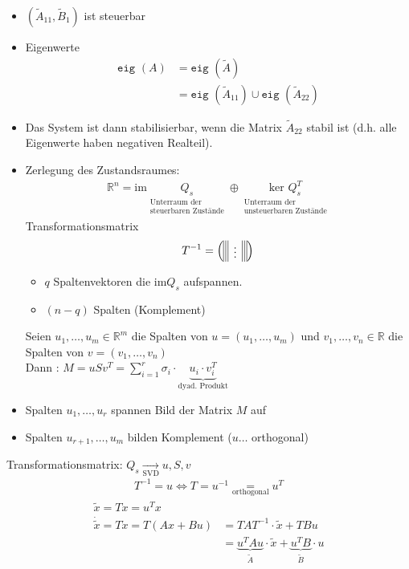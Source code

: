 \documentclass[ngerman]{tudscrreprt}
\begin{document}
\begin{itemize}
\item $(\tilde A_{11}, \tilde B_{1})$ ist steuerbar
\item Eigenwerte \begin{align*}\texttt{eig }(A) &= \texttt{eig }(\tilde A)\\ &= \texttt{eig }(\tilde A_{11}) \cup \texttt{eig }(\tilde A_{22})\end{align*}
\item Das System ist dann stabilisierbar, wenn die Matrix $\tilde A_{22} $ stabil ist (d.h. alle Eigenwerte haben negativen Realteil). 
\item Zerlegung des Zustandsraumes: \begin{align*}
\mathbb{R}^n = \text{im} \underset{\substack{\text{Unterraum der}\\ \text{steuerbaren Zustände}}}{Q_s} \oplus \underset{\substack{\text{Unterraum der}\\ \text{unsteuerbaren Zustände}}}{\text{ker }Q_s^T}
\end{align*}
Transformationsmatrix 
\begin{align*}
T^{-1} = \left(\begin{array}{ ||| c |||}
\vdots
\end{array}\right)
\end{align*}
\begin{itemize}
\item $q$ Spaltenvektoren die im$ Q_s$ aufspannen.
\item $(n-q)$ Spalten (Komplement)
\end{itemize}
Seien $u_1, \dots, u_m \in \mathbb{R}^{m}$ die Spalten von $u = (u_1,\dots, u_m)$ und $v_1, \dots, v_n \in \mathbb{R}$ die Spalten von $v = (v_1, \dots, v_n)$ \\Dann : $M = uSv^T = \sum\limits_{i=1}^{r} \sigma_i \cdot \underbrace{u_i\cdot v_i^T}_{\text{dyad. Produkt}}$ 
\item Spalten $u_1, \dots, u_r$ spannen Bild der Matrix $M$ auf
\item Spalten $u_{r+1},\dots, u_m$ bilden Komplement ($u \dots$ orthogonal)
\end{itemize}
Transformationsmatrix: $Q_s \underset{\text{SVD}}{\rightarrow} u,S,v$ \begin{align*}
T^{-1} = u \iff T = u^{-1} \underset{\text{orthogonal}}{=} u^T
\end{align*}
\begin{align*}
\tilde x = Tx = u^T x \\ 
\dot{\tilde{x}} = T\dot x = T(Ax + Bu) &= TAT^{-1} \cdot \tilde x + TB u\\ 
&= \underbrace{u^T Au}_{\tilde A}\cdot \tilde x + \underbrace{u^TB}_{\tilde B} \cdot u
\end{align*}
\end{document}

